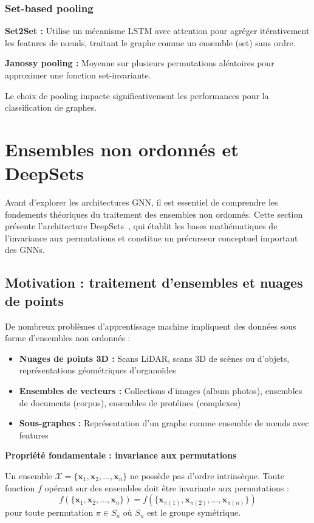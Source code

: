 \subsubsection{Set-based pooling}

\textbf{Set2Set :}
Utilise un mécanisme LSTM avec attention pour agréger itérativement les features de nœuds, traitant le graphe comme un ensemble (set) sans ordre.

\textbf{Janossy pooling :}
Moyenne sur plusieurs permutations aléatoires pour approximer une fonction set-invariante.

Le choix de pooling impacte significativement les performances pour la classification de graphes.

\section{Ensembles non ordonnés et DeepSets}

Avant d'explorer les architectures GNN, il est essentiel de comprendre les fondements théoriques du traitement des ensembles non ordonnés. Cette section présente l'architecture DeepSets~\cite{Zaheer2017}, qui établit les bases mathématiques de l'invariance aux permutations et constitue un précurseur conceptuel important des GNNs.

\subsection{Motivation : traitement d'ensembles et nuages de points}

De nombreux problèmes d'apprentissage machine impliquent des données sous forme d'ensembles non ordonnés :
\begin{itemize}
    \item \textbf{Nuages de points 3D :} Scans LiDAR, scans 3D de scènes ou d'objets, représentations géométriques d'organoïdes
    \item \textbf{Ensembles de vecteurs :} Collections d'images (album photos), ensembles de documents (corpus), ensembles de protéines (complexes)
    \item \textbf{Sous-graphes :} Représentation d'un graphe comme ensemble de nœuds avec features
\end{itemize}

\textbf{Propriété fondamentale : invariance aux permutations}

Un ensemble $\mathcal{X} = \{\mathbf{x}_1, \mathbf{x}_2, \ldots, \mathbf{x}_n\}$ ne possède pas d'ordre intrinsèque. Toute fonction $f$ opérant sur des ensembles doit être invariante aux permutations :
\[
f(\{\mathbf{x}_1, \mathbf{x}_2, \ldots, \mathbf{x}_n\}) = f(\{\mathbf{x}_{\pi(1)}, \mathbf{x}_{\pi(2)}, \ldots, \mathbf{x}_{\pi(n)}\})
\]
pour toute permutation $\pi \in S_n$ où $S_n$ est le groupe symétrique.


